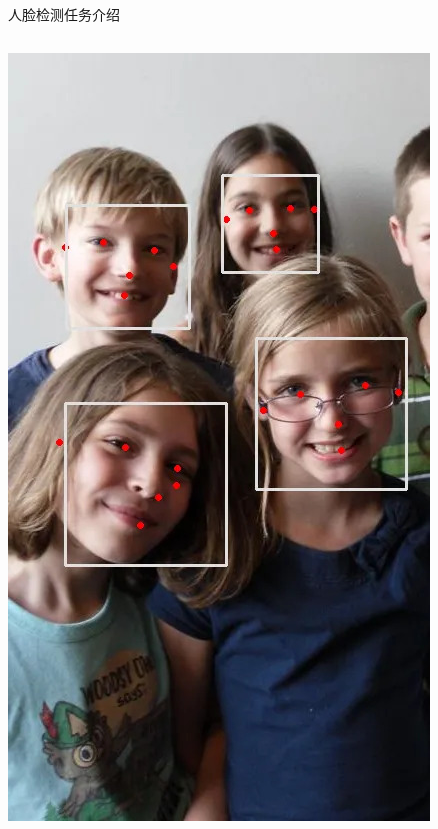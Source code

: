 \documentclass{beamer}
\begin{document}
\begin{frame}{人脸检测任务介绍}
\begin{columns}[T]
\begin{column}{0.3\textwidth}
            \includegraphics[height=0.7\textheight]{pic/detection_demo.jpg}
            \vfill
        \end{column}
    \end{columns}
\end{frame}

\end{document}
